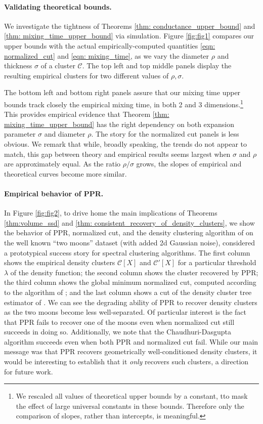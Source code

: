 \documentclass[11pt,twoside]{article}
\newcommand{\1}{\mathbf{1}}
\newcommand{\Xbf}{X}             %
\newcommand{\Cset}{\mathcal{C}}
\begin{document}
\paragraph{Validating theoretical bounds.}  We investigate the tightness of
Theorems \ref{thm: conductance_upper_bound} and \ref{thm:
  mixing_time_upper_bound} via simulation. Figure \ref{fig:fig1} compares our
upper bounds with the actual empirically-computed quantities \eqref{eqn:
  normalized_cut} and \eqref{eqn: mixing_time}, as we vary the diameter $\rho$
and thickness $\sigma$ of a cluster $\Cset$. The top left and top middle panels
display the resulting empirical clusters for two different values of
$\rho,\sigma$. 

The bottom left and bottom right panels assure that our mixing  
time upper bounds track closely the empirical mixing time, in both 2 and 3 
dimensions.\footnote{We rescaled all values of theoretical upper
  bounds by a constant, tto mask the effect of large universal constants
  in these bounds. Therefore only the comparison of slopes, rather than
  intercepts, is meaningful.} This provides empirical evidence that Theorem
\ref{thm: mixing_time_upper_bound} has the right dependency on both expansion
parameter $\sigma$ and diameter $\rho$. The story for the normalized cut panels
is less obvious. We remark that while, broadly speaking, the trends do not
appear to match, this gap between theory and empirical results seems largest
when $\sigma $ and $\rho$ are approximately equal. As the ratio $\rho/\sigma$
grows, the slopes of empirical and theoretical curves become more similar.

\paragraph{Empirical behavior of PPR.} In Figure \ref{fig:fig2}, to drive home
the main implications of Theorems \ref{thm:volume_ssd} and
\ref{thm: consistent_recovery_of_density_clusters}, we show the
behavior of PPR, normalized cut, and the density clustering algorithm of
\citet{chaudhuri2010} on the well known ``two moons'' dataset (with added 2d 
Gaussian noise), considered a prototypical success story for spectral clustering
algorithms. The first column shows the empirical density clusters $\Cset[\Xbf]$
and $\Cset'[\Xbf]$ for a particular threshold $\lambda$ of the density function; the 
second column shows the cluster recovered by PPR; the third column shows the
global minimum normalized cut, computed according to the algorithm of
\citet{szlam2010}; and the last column shows a cut of the density cluster tree
estimator of \citet{chaudhuri2010}.  We can see the degrading ability of PPR to
recover density clusters as the two moons become less well-separated. Of 
particular interest is the fact that PPR fails to recover one of the moons even
when normalized cut still succeeds in doing so. Additionally, we note that the Chaudhuri-Dasgupta algorithm succeeds even when both PPR and normalized cut fail.  While our main message was
that PPR recovers geometrically well-conditioned density clusters, it would be  
interesting to establish that it \emph{only} recovers such clusters, a direction
for future work.   
\end{document}
